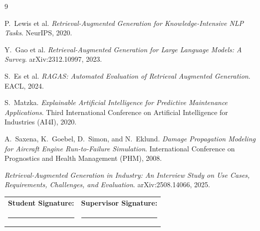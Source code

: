 \documentclass[10pt,a4paper]{article}
\begin{document}
\begingroup
\renewcommand{\refname}{\texorpdfstring{\color{mainblue}}{}Preliminary References}
\scriptsize
\begin{thebibliography}{9}
\setlength{\itemsep}{0pt}

P.\ Lewis et al.
\textit{Retrieval-Augmented Generation for Knowledge-Intensive NLP Tasks}.
NeurIPS, 2020.

Y.\ Gao et al.
\textit{Retrieval-Augmented Generation for Large Language Models: A Survey}.
arXiv:2312.10997, 2023.

S.\ Es et al.
\textit{RAGAS: Automated Evaluation of Retrieval Augmented Generation}.
EACL, 2024.

S.\ Matzka.
\textit{Explainable Artificial Intelligence for Predictive Maintenance Applications}.
Third International Conference on Artificial Intelligence for Industries (AI4I), 2020.

A.\ Saxena, K.\ Goebel, D.\ Simon, and N.\ Eklund.
\textit{Damage Propagation Modeling for Aircraft Engine Run-to-Failure Simulation}.
International Conference on Prognostics and Health Management (PHM), 2008.

\textit{Retrieval-Augmented Generation in Industry: An Interview Study on Use Cases, Requirements, Challenges, and Evaluation}.
arXiv:2508.14066, 2025.

\end{thebibliography}
\endgroup

\vspace{0.1em}

\noindent
\begin{tabularx}{\textwidth}{X X}
\textbf{Student Signature:} & \textbf{Supervisor Signature:} \\[0.9em]
\rule{0.42\textwidth}{0.4pt} & \rule{0.42\textwidth}{0.4pt} \\
\end{tabularx}
\end{document}
